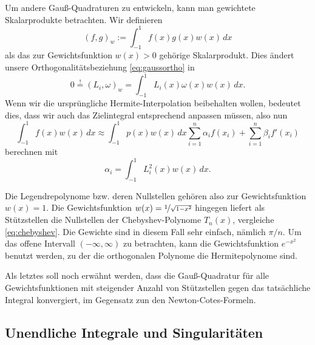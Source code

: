 Um andere Gauß-Quadraturen zu entwickeln, kann man gewichtete
Skalarprodukte betrachten. Wir definieren
\begin{equation}
  (f,g)_w := \int_{-1}^1 f(x)g(x)w(x)\, dx
\end{equation}
als das zur Gewichtsfunktion $w(x)>0$ gehörige Skalarprodukt. Dies
ändert unsere Orthogonalitätsbeziehung \eqref{eq:gaussortho} in
\begin{equation}
  0 \stackrel{!}{=} (L_i,\omega)_w = \int_{-1}^1 L_i(x)\omega(x)w(x)\, dx.
\end{equation}
Wenn wir die ursprüngliche Hermite-Interpolation beibehalten wollen,
bedeutet dies, dass wir auch das Zielintegral entsprechend anpassen
müssen, also nun
\begin{equation}
  \int_{-1}^1 f(x) w(x)\, dx \approx \int_{-1}^1 p(x) w(x)\, dx
  \sum_{i=1}^{n} \alpha_i f(x_i) + \sum_{i=1}^{n} \beta_i f'(x_i)
\end{equation}
berechnen mit
\begin{equation}
  \alpha_i = \int_{-1}^1 L_i^2(x)w(x)\, dx.
\end{equation}

Die Legendrepolynome bzw. deren Nullstellen gehören also zur
Gewichtsfunktion $w(x)=1$. Die Gewichtsfunktion
$w(x)=\nicefrac{1}{\sqrt{1-x^2}}$ hingegen liefert als Stützstellen
die Nullstellen der Chebyshev-Polynome $T_n(x)$, vergleiche
\eqref{eq:chebyshev}. Die Gewichte sind in diesem Fall sehr einfach,
nämlich $\pi/n$. Um das offene Intervall $(-\infty,\infty)$ zu
betrachten, kann die Gewichtsfunktion $e^{-x^2}$ benutzt werden, zu
der die orthogonalen Polynome die Hermitepolynome sind.

Als letztes soll noch erwähnt werden, dass die Gauß-Quadratur für alle
Gewichtsfunktionen mit steigender Anzahl von Stützstellen gegen das
tatsächliche Integral konvergiert, im Gegensatz zun den
Newton-Cotes-Formeln.

\subsection{Unendliche Integrale und Singularitäten}

